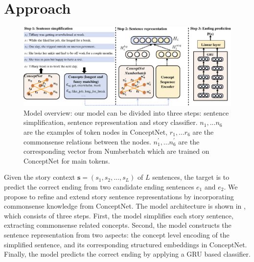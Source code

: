 \section{Approach}
\label{sec:approach}

\begin{figure}[htbp]
\centering
\includegraphics[width=1.8\columnwidth]{pictures/model}
\caption{Model overview: our model can be divided into three steps: sentence simplification, sentence representation and story classifier. ${n_1,...n_6}$ are the examples of token nodes in ConceptNet, ${r_1,...r_6}$  are the commonsense relations between the nodes. ${n_1^{'},...n_6^{'}}$ are the corresponding vector from Numberbatch which are trained on ConceptNet for main tokens.}\label{fig:model}
\end{figure}

Given the story context $\textbf{s} = (s_1, s_2, ..., s_L)$ of $L$ sentences,
the target is to predict the correct ending from two candidate ending
sentences $e_1$ and $e_2$.
We propose to refine and extend story sentence representations
by incorporating commonsense knowledge from ConceptNet.
The model architecture is shown in , which consists of three steps.
First, the model simplifies each story sentence, extracting commonsense related concepts.
Second, the model constructs the sentence representation from two aspects:
the concept level encoding of the simplified sentence,
and its corresponding structured embeddings in ConceptNet.
Finally, the model predicts the correct ending by applying a GRU based classifier.


